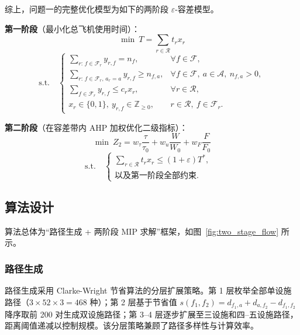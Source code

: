 \documentclass[withoutpreface]{cumcmthesis}
\begin{document}
综上，问题一的完整优化模型为如下的两阶段 $\varepsilon$-容差模型。

\textbf{第一阶段}（最小化总飞机使用时间）：
\begin{equation}
\min \ T = \sum_{r \in \mathcal{R}} t_r x_r
\end{equation}
\begin{equation}
\text{s.t.} \quad
\begin{cases}
\sum_{r:\, f \in \mathcal{F}_r} y_{r,f} = n_f, & \forall f \in \mathcal{F},\\[2pt]
\sum_{r:\, f \in \mathcal{F}_r,\, a_r = a} y_{r,f} \geq n_{f,a}, & \forall f \in \mathcal{F},\ a \in \mathcal{A},\ n_{f,a} > 0,\\[2pt]
\sum_{f \in \mathcal{F}_r} y_{r,f} \leq c_r x_r, & \forall r \in \mathcal{R},\\[2pt]
x_r \in \{0,1\},\ y_{r,f} \in \mathbb{Z}_{\geq 0}, & r \in \mathcal{R},\ f \in \mathcal{F}_r.
\end{cases}
\end{equation}

\textbf{第二阶段}（在容差带内 AHP 加权优化二级指标）：
\begin{equation}
\min \ Z_2 = w_\tau \frac{\tau}{\tau_0} + w_u \frac{W}{W_0} + w_F \frac{F}{F_0}
\end{equation}
\begin{equation}
\text{s.t.} \quad
\begin{cases}
\sum_{r \in \mathcal{R}} t_r x_r \leq (1+\varepsilon) T^*, & \\
\text{以及第一阶段全部约束}. &
\end{cases}
\end{equation}

\subsection{算法设计}

算法总体为“路径生成 + 两阶段 MIP 求解”框架，如图~\ref{fig:two_stage_flow} 所示。



\subsubsection{路径生成}

路径生成采用 Clarke-Wright 节省算法\cite{clarke1964}的分层扩展策略。第 1 层枚举全部单设施路径（$3 \times 52 \times 3 = 468$ 种）；第 2 层基于节省值 $s(f_1, f_2) = d_{f_1,a} + d_{a,f_2} - d_{f_1,f_2}$ 降序取前 200 对生成双设施路径；第 3--4 层逐步扩展至三设施和四--五设施路径，距离阈值递减以控制规模。该分层策略兼顾了路径多样性与计算效率。
\end{document}
